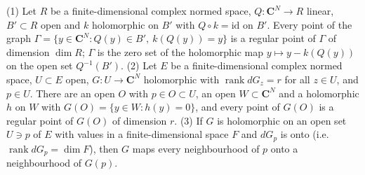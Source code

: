 \begin{lemma}
\label{rem:constant-rank-submanifold}
\leanok
(1) Let \(R\) be a finite-dimensional complex normed space, \(Q\colon\mathbf C^N\to R\) linear, \(B'\subset R\) open and \(k\) holomorphic on \(B'\) with
\(Q\circ k=\mathrm{id}\) on \(B'\). Every point of the graph \(\Gamma=\{y\in\mathbf C^N:Q(y)\in B',\ k(Q(y))=y\}\) is a regular point of \(\Gamma\) of dimension
\(\dim R\); \(\Gamma\) is the zero set of the holomorphic map \(y\mapsto y-k(Q(y))\) on the open set \(Q^{-1}(B')\).
(2) Let \(E\) be a finite-dimensional complex normed space, \(U\subset E\) open, \(G\colon U\to\mathbf C^N\) holomorphic with \(\operatorname{rank}dG_z=r\) for all
\(z\in U\), and \(p\in U\). There are an open \(O\) with \(p\in O\subset U\), an open \(W\subset\mathbf C^N\) and a holomorphic \(h\) on \(W\) with
\(G(O)=\{y\in W:h(y)=0\}\), and every point of \(G(O)\) is a regular point of \(G(O)\) of dimension \(r\).
(3) If \(G\) is holomorphic on an open set \(U\ni p\) of \(E\) with values in a finite-dimensional space \(F\) and \(dG_p\) is onto (i.e.\ \(\operatorname{rank}dG_p=\dim F\)), then
\(G\) maps every neighbourhood of \(p\) onto a neighbourhood of \(G(p)\).
\end{lemma}
